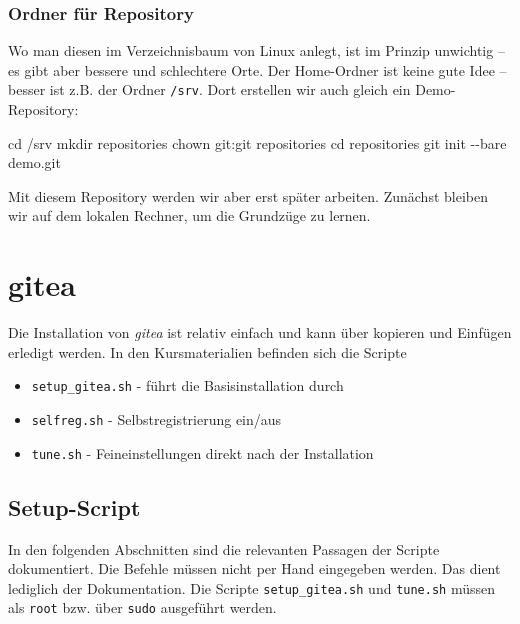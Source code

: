 \documentclass[
  letterpaper,
  DIV=11]{scrreprt}
\newenvironment{Shaded}{\begin{snugshade}}{\end{snugshade}}
\newcommand{\AttributeTok}[1]{\textcolor[rgb]{0.40,0.45,0.13}{#1}}
\newcommand{\BuiltInTok}[1]{\textcolor[rgb]{0.00,0.23,0.31}{#1}}
\newcommand{\FunctionTok}[1]{\textcolor[rgb]{0.28,0.35,0.67}{#1}}
\newcommand{\NormalTok}[1]{\textcolor[rgb]{0.00,0.23,0.31}{#1}}
\providecommand{\tightlist}{%
  \setlength{\itemsep}{0pt}\setlength{\parskip}{0pt}}\usepackage{longtable,booktabs,array}
\begin{document}
\subsection{Ordner für Repository}\label{ordner-fuxfcr-repository}

Wo man diesen im Verzeichnisbaum von Linux anlegt, ist im Prinzip
unwichtig -- es gibt aber bessere und schlechtere Orte. Der Home-Ordner
ist keine gute Idee -- besser ist z.B. der Ordner \texttt{/srv}. Dort
erstellen wir auch gleich ein Demo-Repository:

\begin{Shaded}
\begin{Highlighting}[]
\BuiltInTok{cd}\NormalTok{ /srv }
\FunctionTok{mkdir}\NormalTok{ repositories}
\FunctionTok{chown}\NormalTok{ git:git repositories }
\BuiltInTok{cd}\NormalTok{ repositories}
\FunctionTok{git}\NormalTok{ init }\AttributeTok{{-}{-}bare}\NormalTok{ demo.git}
\end{Highlighting}
\end{Shaded}

Mit diesem Repository werden wir aber erst später arbeiten. Zunächst
bleiben wir auf dem lokalen Rechner, um die Grundzüge zu lernen.


\chapter{gitea}\label{gitea}

Die Installation von \emph{gitea} ist relativ einfach und kann über
kopieren und Einfügen erledigt werden. In den Kursmaterialien befinden
sich die Scripte

\begin{itemize}
\tightlist
\item
  \texttt{setup\_gitea.sh} - führt die Basisinstallation durch
\item
  \texttt{selfreg.sh} - Selbstregistrierung ein/aus
\item
  \texttt{tune.sh} - Feineinstellungen direkt nach der Installation
\end{itemize}

\section{Setup-Script}\label{setup-script}

In den folgenden Abschnitten sind die relevanten Passagen der Scripte
dokumentiert. Die Befehle müssen nicht per Hand eingegeben werden. Das
dient lediglich der Dokumentation. Die Scripte \texttt{setup\_gitea.sh}
und \texttt{tune.sh} müssen als \texttt{root} bzw. über \texttt{sudo}
ausgeführt werden.
\end{document}
